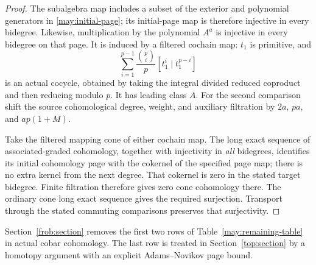 \begin{proof}
The subalgebra map includes a subset of the exterior and polynomial
generators in \eqref{may:initial-page}; its initial-page map is therefore
injective in every bidegree. Likewise, multiplication by the polynomial
$A^a$ is injective in every bidegree on that page. It is induced by a
filtered cochain map: $t_1$ is primitive, and
\begin{equation}
 \sum_{i=1}^{p-1}\frac{\binom pi}{p}
       [t_1^i\mid t_1^{p-i}]
 \label{may:A-cocycle}
\end{equation}
is an actual cocycle, obtained by taking the integral divided reduced
coproduct and then reducing modulo $p$. It has leading class $A$.
For the second comparison shift the source cohomological degree,
weight, and auxiliary filtration by $2a$, $pa$, and $ap(1+M)$.

Take the filtered mapping cone of either cochain map. The long exact
sequence of associated-graded cohomology, together with injectivity in
\emph{all} bidegrees, identifies its initial cohomology page with the
cokernel of the specified page map; there is no extra kernel from the
next degree. That cokernel is zero in the stated target bidegree.
Finite filtration therefore gives zero cone cohomology there. The
ordinary cone long exact sequence gives the required surjection.
Transport through the stated commuting comparisons preserves that
surjectivity.
\end{proof}

Section~\ref{frob:section} removes the first two rows of
Table~\ref{may:remaining-table} in actual cobar cohomology.  The last
row is treated in Section~\ref{top:section} by a homotopy argument with an explicit
Adams--Novikov page bound.
